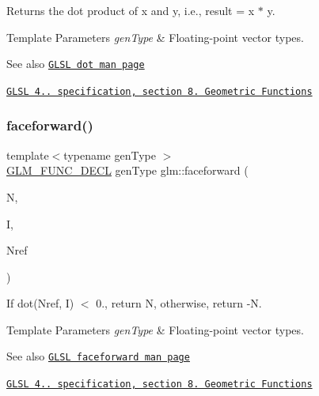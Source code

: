 Returns the dot product of x and y, i.\+e., result = x $\ast$ y.


\begin{DoxyTemplParams}{Template Parameters}
{\em gen\+Type} & Floating-\/point vector types.\\
\hline
\end{DoxyTemplParams}
\begin{DoxySeeAlso}{See also}
\href{http://www.opengl.org/sdk/docs/manglsl/xhtml/dot.xml}{\tt G\+L\+SL dot man page} 

\href{http://www.opengl.org/registry/doc/GLSLangSpec.4.20.8.pdf}{\tt G\+L\+SL 4.. specification, section 8. Geometric Functions} 
\end{DoxySeeAlso}
\mbox{\label{group__core__func__geometric_ga4bbb036ef9527ee9f67384233029ed9b}} 
\subsubsection{\texorpdfstring{faceforward()}{faceforward()}}
{\footnotesize\ttfamily template$<$typename gen\+Type $>$ \\
\hyperlink{setup_8hpp_ab2d052de21a70539923e9bcbf6e83a51}{G\+L\+M\+\_\+\+F\+U\+N\+C\+\_\+\+D\+E\+CL} gen\+Type glm\+::faceforward (\begin{DoxyParamCaption}\item[{gen\+Type const \&}]{N,  }\item[{gen\+Type const \&}]{I,  }\item[{gen\+Type const \&}]{Nref }\end{DoxyParamCaption})}

If dot(\+Nref, I) $<$ 0., return N, otherwise, return -\/N.


\begin{DoxyTemplParams}{Template Parameters}
{\em gen\+Type} & Floating-\/point vector types.\\
\hline
\end{DoxyTemplParams}
\begin{DoxySeeAlso}{See also}
\href{http://www.opengl.org/sdk/docs/manglsl/xhtml/faceforward.xml}{\tt G\+L\+SL faceforward man page} 

\href{http://www.opengl.org/registry/doc/GLSLangSpec.4.20.8.pdf}{\tt G\+L\+SL 4.. specification, section 8. Geometric Functions} 
\end{DoxySeeAlso}


